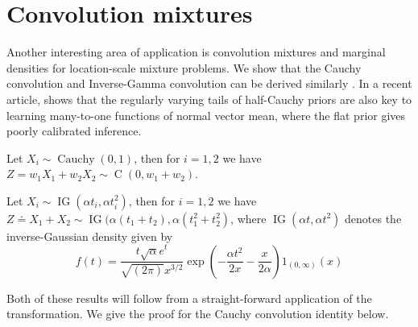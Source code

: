 \documentclass[lineno]{biometrika}
\begin{document}
\section{Convolution mixtures}
\label{sec:convolutions}

Another interesting area of application is convolution mixtures and marginal
densities for location-scale mixture problems. We show that the Cauchy
convolution \citep{pillai2015unexpected} and Inverse-Gamma convolution can be
derived similarly \citep{gelman_prior_2006, polson_halfcauchy_2012}.  In a recent 
article, \citet{bhadra_default_2016} shows that the regularly varying tails of
half-Cauchy priors are also key to learning many-to-one functions of normal
vector mean, where the flat prior gives poorly calibrated inference. 
\begin{lemma}
Let $X_i \sim \operatorname{Cauchy}(0,1)$, then for 
$i =1, 2$ we have 
$Z = w_1 X_1 + w_2 X_2 \sim \operatorname{C}\left( 0, w_1 + w_2 \right)$.
\end{lemma}

\begin{lemma}
Let $X_i \sim \operatorname{IG}(\alpha t_i, \alpha t_i^2)$, then for 
$i = 1, 2$ we have 
$Z \doteq X_1 + X_2 \sim \operatorname{IG}(\alpha (t_1 + t_2), \alpha (t_1^2+t_2^2)$, 
where $\operatorname{IG}(\alpha t, \alpha t^2)$ denotes the inverse-Gaussian 
density given by
$$
  f(t) = \frac{t \sqrt{\alpha} e^t}{\sqrt{(2 \pi)} x^{3/2}} 
  \exp\left( -\frac{\alpha t^2}{2x} - \frac{x}{2\alpha} \right) 1_{(0,\infty)}(x) 
$$
\end{lemma}

Both of these results will follow from a straight-forward application of the \CS{} 
transformation. We give the proof for the Cauchy convolution identity below.
\end{document}
